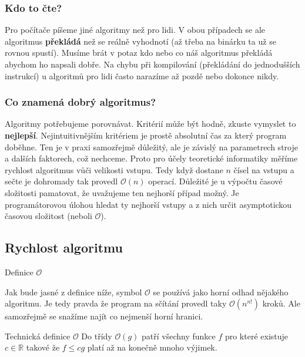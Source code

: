 \documentclass{beamer}
\newcommand{\bigO}{\mathcal{O}}
\begin{document}
\begin{frame}
 \frametitle{Kdo to čte?}

 Pro počítače píšeme jiné algoritmy než pro lidi.
\vfill
 V obou případech se ale algoritmus \textbf{překládá} než se reálně vyhodnotí
 (až třeba na binárku ta už se rovnou spustí). Musíme brát v potaz kdo nebo co
 náš algoritmus překládá abychom ho napsali dobře. 
\vfill
 Na chybu při kompilování (překládání do jednodušších instrukcí) u algoritmů pro
 lidi často narazíme až pozdě nebo dokonce nikdy.
\end{frame}


\begin{frame}
 \frametitle{Co znamená dobrý algoritmus?}
Algoritmy potřebujeme porovnávat. Kritérií může být hodně, zkuste vymyslet to
\textbf{nejlepší}. Nejintuitivnějším kritériem je prostě absolutní čas za který
program doběhne. Ten je v praxi samozřejmě důležitý, ale je závislý na
parametrech stroje a dalších faktorech, což nechceme.
\vfill
Proto pro účely teoretické informatiky měříme rychlost algoritmus vůči velikosti vstupu. Tedy když
dostane $n$ čísel na vstupu a sečte je dohromady tak provedl $\bigO(n)$ operací.
\vfill
Důležité je u výpočtu časové složitosti pamatovat, že uvažujeme ten nejhorší
případ možný. Je programátorovou úlohou hledat ty nejhorší vstupy a z nich
určit asymptotickou časovou složitost (neboli $\bigO$).

\end{frame}

\subsection{Rychlost algoritmu}
\label{ssec:rychlost-algoritmu}


\begin{frame}{Definice $\bigO$}

Jak bude jasné z definice níže, symbol $\bigO$ se používá jako horní odhad
nějakého algoritmu. Je tedy pravda že program na sčítání provedl taky
$\bigO(n^{n!})$ kroků. Ale samozřejmě se snažíme najít co nejmenší horní
hranici.

\vfill
\begin{block}{Technická definice $\bigO$}
Do třídy $\bigO(g)$ patří všechny funkce $f$ pro které existuje $c \in
\mathbb{R}$ takové že $f \leq cg$ platí až na konečně mnoho výjimek.
\end{block}
\end{frame}
\end{document}

